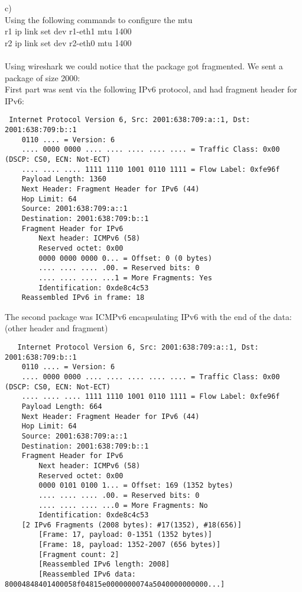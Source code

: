 \documentclass[a4paper]{article}
\begin{document}
c)\\
Using the following commands to configure the mtu\\ 
r1 ip link set dev r1-eth1 mtu 1400\\
r2 ip link set dev r2-eth0 mtu 1400\\
\\Using wireshark we could notice that the package got fragmented. We sent a package of size 2000:\\
 First part was sent via the following IPv6 protocol, and had fragment header for IPv6:\\
 \begin{verbatim}
 Internet Protocol Version 6, Src: 2001:638:709:a::1, Dst: 2001:638:709:b::1
    0110 .... = Version: 6
    .... 0000 0000 .... .... .... .... .... = Traffic Class: 0x00 (DSCP: CS0, ECN: Not-ECT)
    .... .... .... 1111 1110 1001 0110 1111 = Flow Label: 0xfe96f
    Payload Length: 1360
    Next Header: Fragment Header for IPv6 (44)
    Hop Limit: 64
    Source: 2001:638:709:a::1
    Destination: 2001:638:709:b::1
    Fragment Header for IPv6
        Next header: ICMPv6 (58)
        Reserved octet: 0x00
        0000 0000 0000 0... = Offset: 0 (0 bytes)
        .... .... .... .00. = Reserved bits: 0
        .... .... .... ...1 = More Fragments: Yes
        Identification: 0xde8c4c53
    Reassembled IPv6 in frame: 18

 \end{verbatim}
 The second package was ICMPv6 encapsulating IPv6 with the end of the data: (other header and fragment)\\
 \begin{verbatim}
   Internet Protocol Version 6, Src: 2001:638:709:a::1, Dst: 2001:638:709:b::1
    0110 .... = Version: 6
    .... 0000 0000 .... .... .... .... .... = Traffic Class: 0x00 (DSCP: CS0, ECN: Not-ECT)
    .... .... .... 1111 1110 1001 0110 1111 = Flow Label: 0xfe96f
    Payload Length: 664
    Next Header: Fragment Header for IPv6 (44)
    Hop Limit: 64
    Source: 2001:638:709:a::1
    Destination: 2001:638:709:b::1
    Fragment Header for IPv6
        Next header: ICMPv6 (58)
        Reserved octet: 0x00
        0000 0101 0100 1... = Offset: 169 (1352 bytes)
        .... .... .... .00. = Reserved bits: 0
        .... .... .... ...0 = More Fragments: No
        Identification: 0xde8c4c53
    [2 IPv6 Fragments (2008 bytes): #17(1352), #18(656)]
        [Frame: 17, payload: 0-1351 (1352 bytes)]
        [Frame: 18, payload: 1352-2007 (656 bytes)]
        [Fragment count: 2]
        [Reassembled IPv6 length: 2008]
        [Reassembled IPv6 data: 80004848401400058f04815e0000000074a5040000000000...]
\end{verbatim}\\\\
\end{document}
